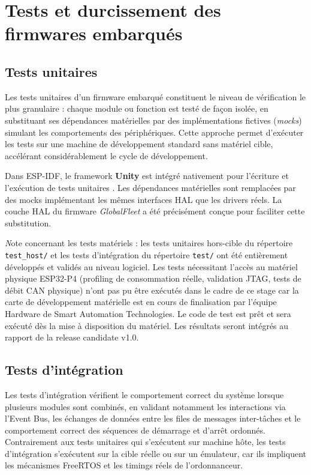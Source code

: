 \section{Tests et durcissement des firmwares embarqués}
\label{sec:tests}

\subsection{Tests unitaires}
\label{subsec:unit_tests}

Les tests unitaires d'un firmware embarqué constituent le niveau de
vérification le plus granulaire : chaque module ou fonction est testé
de façon isolée, en substituant ses dépendances matérielles par des
implémentations fictives (\textit{mocks}) simulant les comportements
des périphériques. Cette approche permet d'exécuter les tests sur
une machine de développement standard sans matériel cible,
accélérant considérablement le cycle de développement.

Dans ESP-IDF, le framework \textbf{Unity} est intégré nativement
pour l'écriture et l'exécution de tests unitaires \cite{unity_testing}.
Les dépendances matérielles sont remplacées par des mocks implémentant
les mêmes interfaces HAL que les drivers réels. La couche HAL du
firmware \textit{GlobalFleet} a été précisément conçue pour faciliter
cette substitution.

\medskip
\noindent
\textit Note concernant les tests matériels : les tests unitaires
hors-cible du répertoire \texttt{test\_host/} et les tests
d'intégration du répertoire \texttt{test/} ont été entièrement
développés et validés au niveau logiciel. Les tests nécessitant
l'accès au matériel physique ESP32-P4 (profiling de consommation
réelle, validation JTAG, tests de débit CAN physique) n'ont pas pu
être exécutés dans le cadre de ce stage car la carte de développement
matérielle est en cours de finalisation par l'équipe Hardware de
Smart Automation Technologies. Le code de test est prêt et sera
exécuté dès la mise à disposition du matériel. Les résultats seront
intégrés au rapport de la release candidate v1.0.

\subsection{Tests d'intégration}
\label{subsec:integration_tests}

Les tests d'intégration vérifient le comportement correct du système
lorsque plusieurs modules sont combinés, en validant notamment les
interactions via l'Event Bus, les échanges de données entre les files
de messages inter-tâches et le comportement correct des séquences
de démarrage et d'arrêt ordonnés. Contrairement aux tests unitaires
qui s'exécutent sur machine hôte, les tests d'intégration s'exécutent
sur la cible réelle ou sur un émulateur, car ils impliquent les
mécanismes FreeRTOS et les timings réels de l'ordonnanceur.

